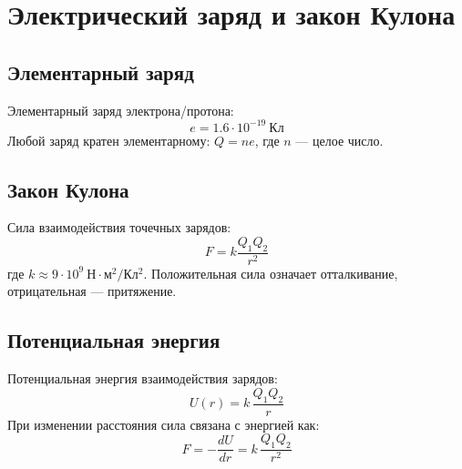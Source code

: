 \documentclass[12pt]{article}
\begin{document}
\section*{Электрический заряд и закон Кулона}

\subsection*{Элементарный заряд}
Элементарный заряд электрона/протона:
\[e = 1.6\cdot10^{-19}\ \mathrm{Кл}\]
Любой заряд кратен элементарному: $Q = ne$, где $n$ — целое число.

\subsection*{Закон Кулона}
Сила взаимодействия точечных зарядов:
\[F = k \frac{Q_{1} Q_{2}}{r^{2}}\]
где $k\approx9\cdot10^{9}\ \mathrm{Н\cdot м^{2}/Кл^{2}}$. Положительная сила означает отталкивание, отрицательная — притяжение.

\subsection*{Потенциальная энергия}
Потенциальная энергия взаимодействия зарядов:
\[U(r)=k\,\frac{Q_{1}Q_{2}}{r}\]
При изменении расстояния сила связана с энергией как:
\[F=-\frac{dU}{dr}=k\,\frac{Q_{1}Q_{2}}{r^{2}}\]
\end{document}
